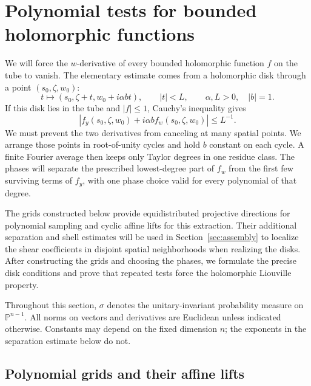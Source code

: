 \section{Polynomial tests for bounded holomorphic functions}
\label{sec:analytic}

We will force the $w$-derivative of every bounded holomorphic function
$f$ on the tube to vanish. The elementary estimate comes from a holomorphic
disk through a point $(s_0,\zeta,w_0)$:
\[
 t\longmapsto(s_0,\zeta+t,w_0+i\alpha b t),\qquad |t|<L,
 \qquad \alpha,L>0,\quad |b|=1.
\]
If this disk lies in the tube and $|f|\le1$, Cauchy's inequality gives
\[
 |f_y(s_0,\zeta,w_0)+i\alpha b f_w(s_0,\zeta,w_0)|\le L^{-1}.
\]
We must prevent the two derivatives from canceling at many spatial
points. We arrange those points in root-of-unity cycles and hold $b$
constant on each cycle. A finite Fourier average then keeps only Taylor
degrees in one residue class. The phases will separate the prescribed
lowest-degree part of $f_w$ from the first few surviving terms of $f_y$,
with one phase choice valid for every polynomial of that degree.

The grids constructed below provide equidistributed projective directions
for polynomial sampling and cyclic affine lifts for this extraction.
Their additional separation and shell estimates will be used in
Section~\ref{sec:assembly} to localize the shear coefficients in disjoint
spatial neighborhoods when realizing the disks. After constructing the grids
and choosing the phases, we formulate the precise disk conditions and
prove that repeated tests force the holomorphic Liouville property.

Throughout this section, $\sigma$ denotes the unitary-invariant
probability measure on $\mathbb P^{n-1}$.  All norms on vectors and
derivatives are Euclidean unless indicated otherwise.  Constants may
depend on the fixed dimension $n$; the exponents in the separation
estimate below do not.

\subsection{Polynomial grids and their affine lifts}

